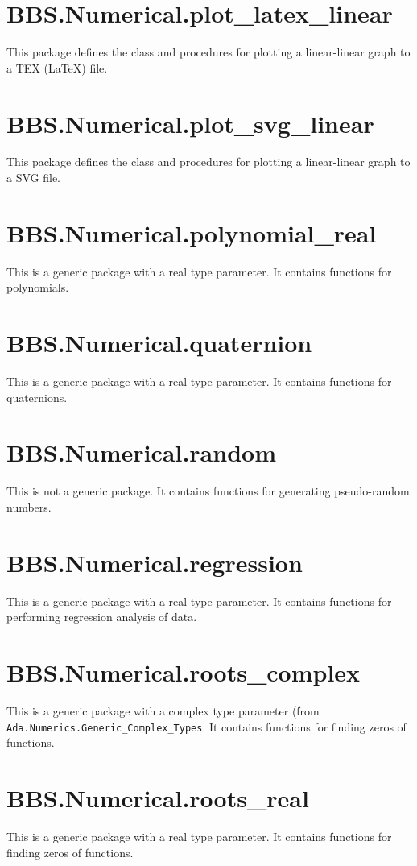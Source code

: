 \documentclass[10pt, openany]{book}
\newcommand{\package}[1]{\texttt{#1}}
\begin{document}
\section{BBS.Numerical.plot\_latex\_linear}
This package defines the class and procedures for plotting a linear-linear graph to a TEX (\LaTeX) file.

\section{BBS.Numerical.plot\_svg\_linear}
This package defines the class and procedures for plotting a linear-linear graph to a SVG file.

\section{BBS.Numerical.polynomial\_real}
This is a generic package with a real type parameter.  It contains functions for polynomials.

\section{BBS.Numerical.quaternion}
This is a generic package with a real type parameter.  It contains functions for quaternions.

\section{BBS.Numerical.random}
This is not a generic package.  It contains functions for generating pseudo-random numbers.

\section{BBS.Numerical.regression}
This is a generic package with a real type parameter.  It contains functions for performing regression analysis of data.

\section{BBS.Numerical.roots\_complex}
This is a generic package with a complex type parameter (from \package{Ada.Numerics.Generic\_Complex\_Types}.  It contains functions for finding zeros of functions.

\section{BBS.Numerical.roots\_real}
This is a generic package with a real type parameter.  It contains functions for finding zeros of functions.
\end{document}
